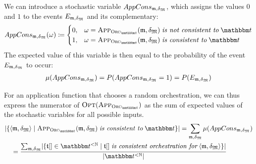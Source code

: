 We can introduce a stochastic variable $AppCons_{\modeltuple{m},\changetuple{\metamodeltuple{M}}}$, which assigns the values $0$ and $1$ to the events $E_{\modeltuple{m},\changetuple{\metamodeltuple{M}}}$ and its complementary:
\begin{align*}
    AppCons_{\modeltuple{m},\changetuple{\metamodeltuple{M}}}(\omega) \equalsperdefinition 
    \begin{cases}
        0, & \omega = \appfunction{\orcfunction{\transformationset{T}}}(\modeltuple{m}, \changetuple{\metamodeltuple{M}}) \mathtextspacearound{is not consistent to} \transformationset{T} \\
        1, & \omega = \appfunction{\orcfunction{\transformationset{T}}}(\modeltuple{m}, \changetuple{\metamodeltuple{M}}) \mathtextspacearound{is consistent to} \transformationset{T}
    \end{cases}
\end{align*}
The expected value of this variable is then equal to the probability of the event $E_{\modeltuple{m},\changetuple{\metamodeltuple{M}}}$ to occur:
\begin{align*}
    \mu(AppCons_{\modeltuple{m},\changetuple{\metamodeltuple{M}}}) = P(AppCons_{\modeltuple{m},\changetuple{\metamodeltuple{M}}} = 1) = P(E_{\modeltuple{m},\changetuple{\metamodeltuple{M}}})
\end{align*}

For an application function that chooses a random orchestration, we can thus express the numerator of $\function{Opt}(\appfunction{\orcfunction{\transformationset{T}}})$ as the sum of expected values of the stochastic variables for all possible inputs.
\begin{align*}
    &
    \abs{\setted{\tupled{\modeltuple{m},\changetuple{\metamodeltuple{M}}} \mid \appfunction{\orcfunction{\transformationset{T}}}(\modeltuple{m}, \changetuple{\metamodeltuple{M}}) \mathtextspacearound{is consistent to} \transformationset{T}}} = \sum_{\modeltuple{m},\changetuple{\metamodeltuple{M}}} \mu(AppCons_{\modeltuple{m},\changetuple{\metamodeltuple{M}}}) \\
    & \formulaskip
    = \frac{
        \sum_{\modeltuple{m},\changetuple{\metamodeltuple{M}}} \abs{\setted{\sequence{\transformation{t}} \in \transformationset{T}^{< \mathbb{N}} \mid \sequence{\transformation{t}} \mathtextspacearound{is consistent orchestration for} \tupled{\modeltuple{m}, \changetuple{\metamodeltuple{M}}}}}
    }{
        \abs{\transformationset{T}^{< \mathbb{N}}}
    }
\end{align*}

